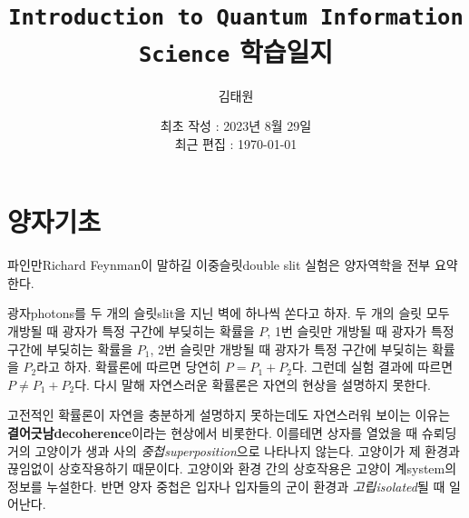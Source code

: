 \documentclass[a4paper,chapter,atbegshi]{oblivoir}
\title{\texttt{Introduction to Quantum Information Science} 학습일지}
\author{김태원}
\date{최초 작성 : 2023년 8월 29일 \\ 최근 편집 : \today}
\begin{document}
\maketitle
\break
\tableofcontents
\chapter{양자기초}
파인만{\tiny Richard Feynman}이 말하길 이중슬릿{\tiny double slit} 실험은
양자역학을 전부 요약한다. 

광자{\tiny photons}를 두 개의 슬릿{\tiny slit}을 지닌 벽에 하나씩 쏜다고 하자.
두 개의 슬릿 모두 개방될 때 광자가 특정 구간에 부딪히는 확률을 $P$, 1번 슬릿만
개방될 때 광자가 특정 구간에 부딪히는 확률을 $P_1$, 2번 슬릿만 개방될 때 광자가
특정 구간에 부딪히는 확률을 $P_2$라고 하자. 확률론에 따르면 당연히 $P=P_1+P_2$다.
그런데 실험 결과에 따르면 $P\neq P_1+P_2$다. 다시 말해 자연스러운 확률론은 자연의 
현상을 설명하지 못한다.

고전적인 확률론이 자연을 충분하게 설명하지 못하는데도 자연스러워 보이는 이유는 
\textbf{결어긋남\tiny decoherence}이라는 현상에서 비롯한다. 이를테면 상자를
열었을 때 슈뢰딩거의 고양이가 생과 사의 \emph{중첩\tiny superposition}으로
나타나지 않는다. 고양이가 제 환경과 끊임없이 상호작용하기 때문이다. 고양이와
환경 간의 상호작용은 고양이 계{\tiny system}의 정보를 누설한다. 반면 양자
중첩은 입자나 입자들의 군이 환경과 \emph{고립\tiny isolated}될 때 일어난다.
\end{document}
